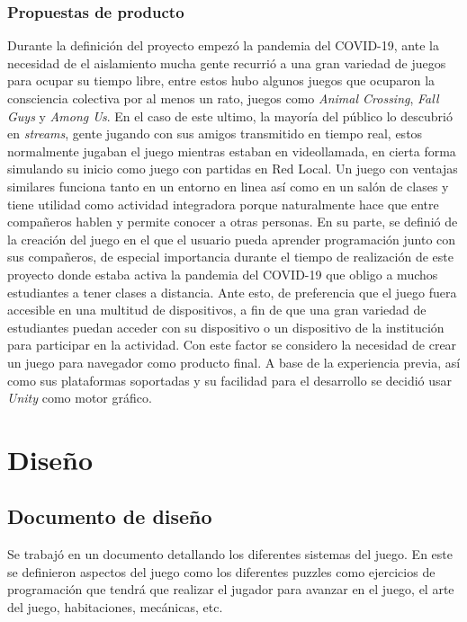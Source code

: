 \subsubsection{Propuestas de producto}
Durante la definición del proyecto empezó la pandemia del COVID-19, ante la necesidad de el aislamiento mucha gente recurrió a una gran variedad de juegos para ocupar su tiempo libre, entre estos hubo algunos juegos que ocuparon la consciencia colectiva por al menos un rato, juegos como \textit{Animal Crossing}, \textit{Fall Guys} y \textit{Among Us}. En el caso de este ultimo, la mayoría del público lo descubrió en \textit{streams}, gente jugando con sus amigos transmitido en tiempo real, estos normalmente jugaban el juego mientras estaban en videollamada, en cierta forma simulando su inicio como juego con partidas en Red Local. Un juego con ventajas similares funciona tanto en un entorno en linea así como en un salón de clases y tiene utilidad como actividad integradora porque naturalmente hace que entre compañeros hablen y permite conocer a otras personas.
En su parte, se definió de la creación del juego en el que el usuario pueda aprender programación junto con sus compañeros, de especial importancia durante el tiempo de realización de este proyecto donde estaba activa la pandemia del COVID-19 que obligo a muchos estudiantes a tener clases a distancia. Ante esto, de preferencia que el juego fuera accesible en una multitud de dispositivos, a fin de que una gran variedad de estudiantes puedan acceder con su dispositivo o un dispositivo de la institución para participar en la actividad. Con este factor se considero la necesidad de crear un juego para navegador como producto final. A base de la experiencia previa, así como sus plataformas soportadas y su facilidad para el desarrollo se decidió usar \textit{Unity} como motor gráfico.

\section{Diseño}
\subsection{Documento de diseño}
Se trabajó en un documento detallando los diferentes sistemas del juego. En este se definieron aspectos del juego como los diferentes puzzles como ejercicios de programación que tendrá que realizar el jugador para avanzar en el juego, el arte del juego, habitaciones, mecánicas, etc.

